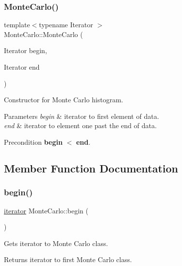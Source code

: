 \subsubsection{\texorpdfstring{Monte\+Carlo()}{MonteCarlo()}}
{\footnotesize\ttfamily template$<$typename Iterator $>$ \\
Monte\+Carlo\+::\+Monte\+Carlo (\begin{DoxyParamCaption}\item[{Iterator}]{begin,  }\item[{Iterator}]{end }\end{DoxyParamCaption})}

Constructor for Monte Carlo histogram. 
\begin{DoxyParams}{Parameters}
{\em begin} & iterator to first element of data. \\
\hline
{\em end} & iterator to element one past the end of data. \\
\hline
\end{DoxyParams}
\begin{DoxyPrecond}{Precondition}
{\bfseries begin} $<$ {\bfseries end}. 
\end{DoxyPrecond}


\subsection{Member Function Documentation}
\mbox{\label{classMonteCarlo_ab9578a53842f7df281ad198f195f3c47}} 
\subsubsection{\texorpdfstring{begin()}{begin()}\hspace{0.1cm}{\footnotesize\ttfamily [1/2]}}
{\footnotesize\ttfamily \hyperlink{classMonteCarlo_a8f83ff48a51d2f19e5c87b8fade7bbe3}{iterator} Monte\+Carlo\+::begin (\begin{DoxyParamCaption}{ }\end{DoxyParamCaption})\hspace{0.3cm}{\ttfamily [inline]}}

Gets iterator to Monte Carlo class. \begin{DoxyReturn}{Returns}
iterator to first Monte Carlo class. 
\end{DoxyReturn}
\mbox{\label{classMonteCarlo_a9d5ce89a44acd99626bed6351091e981}} 
